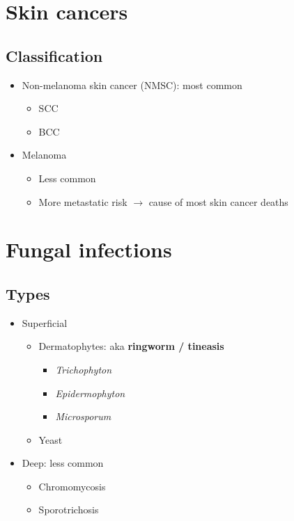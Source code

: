 \documentclass[
  12pt,
]{memoir}
\providecommand{\tightlist}{%
  \setlength{\itemsep}{0pt}\setlength{\parskip}{0pt}}
\begin{document}
\hypertarget{skin-cancers}{%
\section{Skin cancers}\label{skin-cancers}}

\hypertarget{classification-2}{%
\subsection{Classification}\label{classification-2}}

\begin{itemize}
\tightlist
\item
  Non-melanoma skin cancer (NMSC): most common

  \begin{itemize}
  \tightlist
  \item
    SCC
  \item
    BCC
  \end{itemize}
\item
  Melanoma

  \begin{itemize}
  \tightlist
  \item
    Less common
  \item
    More metastatic risk \(\rightarrow\) cause of most skin cancer
    deaths
  \end{itemize}
\end{itemize}

\hypertarget{fungal-infections}{%
\section{Fungal infections}\label{fungal-infections}}

\hypertarget{types}{%
\subsection{Types}\label{types}}

\begin{itemize}
\tightlist
\item
  Superficial

  \begin{itemize}
  \tightlist
  \item
    Dermatophytes: aka \textbf{ringworm / tineasis}

    \begin{itemize}
    \tightlist
    \item
      \emph{Trichophyton}
    \item
      \emph{Epidermophyton}
    \item
      \emph{Microsporum}
    \end{itemize}
  \item
    Yeast
  \end{itemize}
\item
  Deep: less common

  \begin{itemize}
  \tightlist
  \item
    Chromomycosis
  \item
    Sporotrichosis
  \end{itemize}
\end{itemize}
\end{document}
